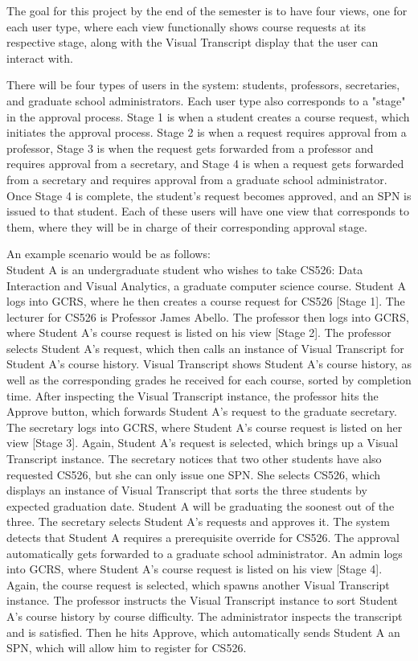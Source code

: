 The goal for this project by the end of the semester is to have four views, one for each user type, where each view functionally shows course requests at its respective stage, along with the Visual Transcript display that the user can interact with. 

There will be four types of users in the system: students, professors, secretaries, and graduate school administrators. Each user type also corresponds to a "stage" in the approval process. Stage 1 is when a student creates a course request, which initiates the approval process. Stage 2 is when a request requires approval from a professor, Stage 3 is when the request gets forwarded from a professor and requires approval from a secretary,  and Stage 4 is when a request gets forwarded from a secretary and requires approval from a graduate school administrator. Once Stage 4 is complete, the student's request becomes approved, and an SPN is issued to that student. Each of these users will have one view that corresponds to them, where they will be in charge of their corresponding approval stage. 

An example scenario would be as follows:
\\
Student A is an undergraduate student who wishes to take CS526: Data Interaction and Visual Analytics, a graduate computer science course. Student A logs into GCRS, where he then creates a course request for CS526 [Stage 1]. The lecturer for CS526 is Professor James Abello. The professor then logs into GCRS, where Student A's course request is listed on his view [Stage 2]. The professor selects Student A's request, which then calls an instance of Visual Transcript for Student A's course history. Visual Transcript shows Student A's course history, as well as the corresponding grades he received for each course, sorted by completion time. After inspecting the Visual Transcript instance, the professor hits the Approve button, which forwards Student A's request to the graduate secretary. The secretary logs into GCRS, where Student A's course request is listed on her view [Stage 3]. Again, Student A's request is selected, which brings up a Visual Transcript instance. The secretary notices that two other students have also requested CS526, but she can only issue one SPN. She selects CS526, which displays an instance of Visual Transcript that sorts the three students by expected graduation date. Student A will be graduating the soonest out of the three. The secretary selects Student A's requests and approves it. The system detects that Student A requires a prerequisite override for CS526. The approval automatically gets forwarded to a graduate school administrator. An admin logs into GCRS, where Student A's course request is listed on his view [Stage 4]. Again, the course request is selected, which spawns another Visual Transcript instance. The professor instructs the Visual Transcript instance to sort Student A's course history by course difficulty. The administrator inspects the transcript and is satisfied. Then he hits Approve, which automatically sends Student A an SPN, which will allow him to register for CS526. 

